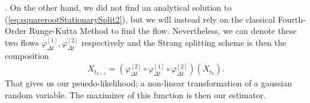 \cite[(5), (6)]{SplittingSchemes}. On the other hand, we did not find an analytical solution to (\ref{eq:squarerootStationarySplit2}), but we will instead rely on the classical Fourth-Order Runge-Kutta Method \cite[p. 541]{numericalAnalysis} to find the flow. Nevertheless, we can denote these two flows $\varphi_{\Delta t}^{[1]}, \varphi_{\Delta t}^{[2]}$ respectively and the Strang splitting scheme is then the composition
\begin{align}
    X_{t_{k + 1}} = \left(\varphi_{\Delta t}^{[2]} \circ \varphi_{\Delta t}^{[1]} \circ \varphi_{\Delta t}^{[2]}\right)\left(X_{t_k}\right).
\end{align}
That gives us our psuedo-likelihood; a non-linear transformation of a gaussian random variable. The maximizer of this function is then our estimator. \\


